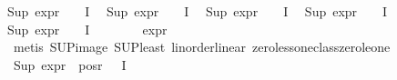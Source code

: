 \begin{isabellebody}
{\isachardoublequoteopen}Sup\ {\isacharparenleft}{\kern0pt}{\isacharparenleft}{\kern0pt}expr{\isacharunderscore}{\kern0pt}{}\ {\isasymcirc}\ {\isasymPhi}{\isacharparenright}{\kern0pt}\ {\isacharbackquote}{\kern0pt}\ I{\isacharparenright}{\kern0pt}\ {\isasymle}\ {}{\isachardoublequoteclose}\isanewline
{\isachardoublequoteopen}Sup\ {\isacharparenleft}{\kern0pt}{\isacharparenleft}{\kern0pt}expr{\isacharunderscore}{\kern0pt}{}\ {\isasymcirc}\ {\isasymPhi}{\isacharparenright}{\kern0pt}\ {\isacharbackquote}{\kern0pt}\ I{\isacharparenright}{\kern0pt}\ {\isasymle}\ {}{\isachardoublequoteclose}\isanewline
{\isachardoublequoteopen}Sup\ {\isacharparenleft}{\kern0pt}{\isacharparenleft}{\kern0pt}expr{\isacharunderscore}{\kern0pt}{}\ {\isasymcirc}\ {\isasymPhi}{\isacharparenright}{\kern0pt}\ {\isacharbackquote}{\kern0pt}\ I{\isacharparenright}{\kern0pt}\ {\isasymle}\ {}{\isachardoublequoteclose}\isanewline
{\isachardoublequoteopen}Sup\ {\isacharparenleft}{\kern0pt}{\isacharparenleft}{\kern0pt}expr{\isacharunderscore}{\kern0pt}{}\ {\isasymcirc}\ {\isasymPhi}{\isacharparenright}{\kern0pt}\ {\isacharbackquote}{\kern0pt}\ I{\isacharparenright}{\kern0pt}\ {\isasymle}\ {}{\isachardoublequoteclose}\isanewline
{\isachardoublequoteopen}Sup\ {\isacharparenleft}{\kern0pt}{\isacharparenleft}{\kern0pt}expr{\isacharunderscore}{\kern0pt}{}\ {\isasymcirc}\ {\isasymPhi}{\isacharparenright}{\kern0pt}\ {\isacharbackquote}{\kern0pt}\ I{\isacharparenright}{\kern0pt}\ {\isasymle}\ {}{\isachardoublequoteclose}\isanewline
\ \ \ \ \isamarkupfalse%
\ expr{\isacharunderscore}{\kern0pt}{\isasymphi}\ \isanewline
\ \ \ \ \isamarkupfalse%
\ {\isacharparenleft}{\kern0pt}metis\ SUP{\isacharunderscore}{\kern0pt}image\ SUP{\isacharunderscore}{\kern0pt}least\ linorder{\isacharunderscore}{\kern0pt}linear\ zero{\isacharunderscore}{\kern0pt}less{\isacharunderscore}{\kern0pt}one{\isacharunderscore}{\kern0pt}class{\isachardot}{\kern0pt}zero{\isacharunderscore}{\kern0pt}le{\isacharunderscore}{\kern0pt}one{\isacharparenright}{\kern0pt}{\isacharplus}{\kern0pt}\isanewline
\ \ \isamarkupfalse%
\ {\isachardoublequoteopen}Sup\ {\isacharparenleft}{\kern0pt}expr{\isacharunderscore}{\kern0pt}{}\ {\isacharbackquote}{\kern0pt}\ {\isacharparenleft}{\kern0pt}pos{\isacharunderscore}{\kern0pt}r\ {\isacharparenleft}{\kern0pt}{\isasymPhi}\ {\isacharbackquote}{\kern0pt}\ I{\isacharparenright}{\kern0pt}{\isacharparenright}{\kern0pt}{\isacharparenright}{\kern0pt}\ {\isasymle}\ {}{\isachardoublequoteclose}\isanewline

\end{isabellebody}
